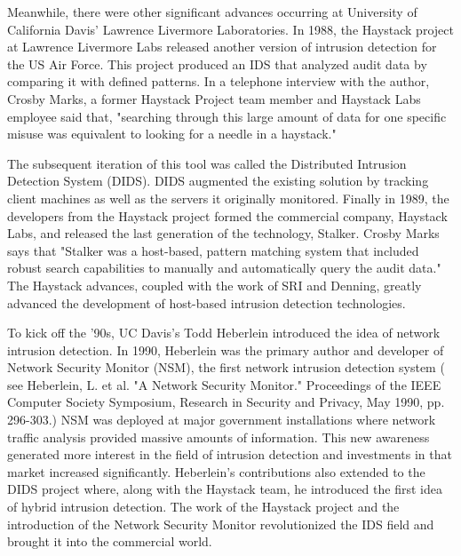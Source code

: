 \documentclass[thesis=M,english]{FITthesis}[2011/07/15]
\begin{document}
Meanwhile, there were other significant advances occurring at University of California Davis' Lawrence Livermore Laboratories. In 1988, the Haystack project at Lawrence Livermore Labs released another version of intrusion detection for the US Air Force. This project produced an IDS that analyzed audit data by comparing it with defined patterns. In a telephone interview with the author, Crosby Marks, a former Haystack Project team member and Haystack Labs employee said that, "searching through this large amount of data for one specific misuse was equivalent to looking for a needle in a haystack."

The subsequent iteration of this tool was called the Distributed Intrusion Detection System (DIDS). DIDS augmented the existing solution by tracking client machines as well as the servers it originally monitored. Finally in 1989, the developers from the Haystack project formed the commercial company, Haystack Labs, and released the last generation of the technology, Stalker. Crosby Marks says that "Stalker was a host-based, pattern matching system that included robust search capabilities to manually and automatically query the audit data." The Haystack advances, coupled with the work of SRI and Denning, greatly advanced the development of host-based intrusion detection technologies.

To kick off the '90s, UC Davis's Todd Heberlein introduced the idea of network intrusion detection. In 1990, Heberlein was the primary author and developer of Network Security Monitor (NSM), the first network intrusion detection system ( see Heberlein, L. et al. "A Network Security Monitor." Proceedings of the IEEE Computer Society Symposium, Research in Security and Privacy, May 1990, pp. 296-303.) NSM was deployed at major government installations where network traffic analysis provided massive amounts of information. This new awareness generated more interest in the field of intrusion detection and investments in that market increased significantly. Heberlein's contributions also extended to the DIDS project where, along with the Haystack team, he introduced the first idea of hybrid intrusion detection. The work of the Haystack project and the introduction of the Network Security Monitor revolutionized the IDS field and brought it into the commercial world.
\end{document}
